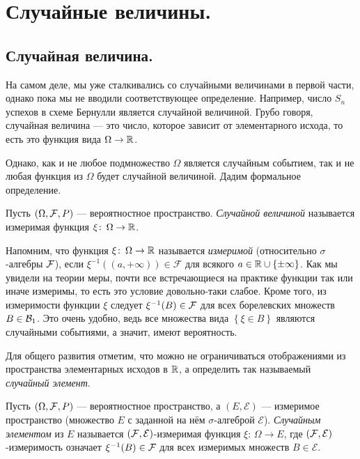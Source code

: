 \documentclass[../main.tex]{subfiles}
\begin{document}
\newpage
\section{Случайные величины.}

\subsection{Случайная величина.}

На самом деле, мы уже сталкивались со случайными величинами в первой части, однако пока мы не вводили соответствующее определение. Например, число $ S_n $ успехов в схеме Бернулли является случайной величиной. Грубо говоря, случайная величина --- это число, которое зависит от элементарного исхода, то есть это функция вида $ \Omega \to \mathbb{R} $.

Однако, как и не любое подмножество $ \Omega $ является случайным событием, так и не любая функция из $ \Omega $ будет случайной величиной. Дадим формальное определение.

\begin{df}
 Пусть $(\Omega, \mathcal F, P)$ --- вероятностное пространство. \textit{Случайной величиной} называется измеримая функция $\xi \colon\, \Omega \to \mathbb{R}$.
\end{df}

Напомним, что функция $ \xi \colon\, \Omega \to \mathbb{R} $ называется \textit{измеримой} (относительно $ \sigma $-алгебры $ \mathcal F $), если $ \xi^{-1}((a, +\infty)) \in \mathcal F $ для всякого $ a \in \mathbb{R} \cup \{\pm \infty\} $. Как мы увидели на теории меры, почти все  встречающиеся на практике функции так или иначе измеримы, то есть это условие довольно-таки слабое. Кроме того, из измеримости функции $ \xi $ следует $ \xi^{-1}(B) \in \mathcal F $ для всех борелевских множеств $ B \in \mathcal B_1 $. Это очень удобно, ведь все множества вида $ \left\{ \xi \in B \right\} $ являются случайными событиями, а значит, имеют вероятность.

Для общего развития отметим, что можно не ограничиваться отображениями из пространства элементарных исходов в $ \mathbb{R} $, а определить так называемый \textit{случайный элемент}.

\begin{df*}
 Пусть $ (\Omega,\mathcal F,P) $ --- вероятностное пространство, а $ (E, \mathcal E) $ --- измеримое пространство (множество $ E $ с заданной на нём $ \sigma $-алгеброй $ \mathcal E $). \textit{Случайным элементом} из $ E $ называется $ (\mathcal F,\mathcal E) $-измеримая функция $ \xi \colon\,\Omega\to E $, где $ (\mathcal F,\mathcal E) $-измеримость означает $\xi^{-1}(B) \in \mathcal F$ для всех измеримых множеств $ B \in \mathcal E $.
\end{df*}
\end{document}

